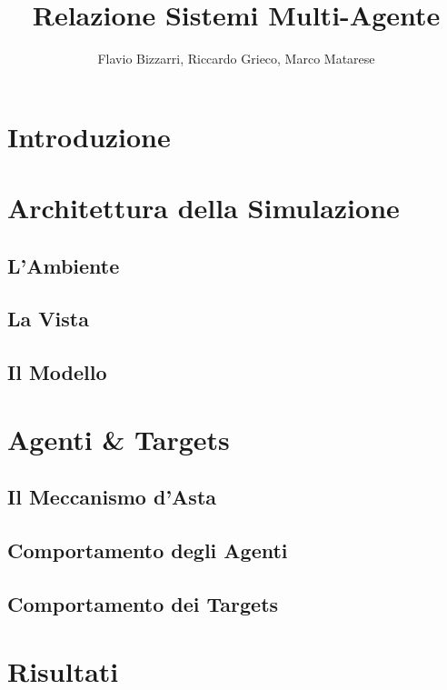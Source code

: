 \documentclass[12pt]{article}
\title{Relazione Sistemi Multi-Agente}
\author{Flavio Bizzarri, Riccardo Grieco, Marco Matarese}
\begin{document}

\newpage

\tableofcontents

\newpage

\section{Introduzione}


\newpage

\section{Architettura della Simulazione}
	\subsection{L'Ambiente}
	
	\subsection{La Vista}
	
	\subsection{Il Modello}
	
	
	\newpage

\section{Agenti \& Targets}
	\subsection{Il Meccanismo d'Asta}
	
	\subsection{Comportamento degli Agenti}
	
	\subsection{Comportamento dei Targets}
	
	
	\newpage
	
\section{Risultati}
\end{document}
